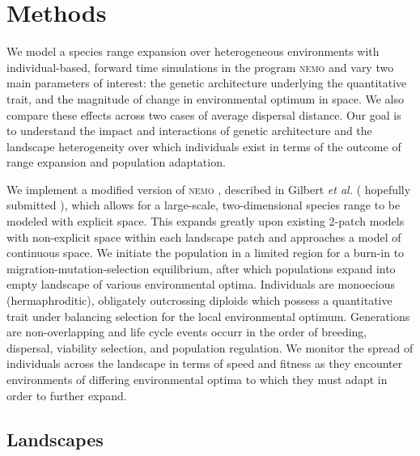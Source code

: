 


\section{Methods}


We model a species range expansion over heterogeneous environments with individual-based, forward time simulations in the program \textsc{nemo} \citep{Guillaume:2006} and vary two main parameters of interest: the genetic architecture underlying the quantitative trait, and the magnitude of change in environmental optimum in space. We also compare these effects across two cases of average dispersal distance. Our goal is to understand the impact and interactions of genetic architecture and the landscape heterogeneity over which individuals exist in terms of the outcome of range expansion and population adaptation.

We implement a modified version of \textsc{nemo} \citep{Guillaume:2006}, described in Gilbert \emph{et al.} (\color{red} \footnotesize hopefully submitted \normalsize \color{black}), which allows for a large-scale, two-dimensional species range to be modeled with explicit space. This expands greatly upon existing 2-patch models with non-explicit space within each landscape patch and approaches a model of continuous space. We initiate the population in a limited region for a burn-in to migration-mutation-selection equilibrium, after which populations expand into empty landscape of various environmental optima. Individuals are monoecious (hermaphroditic), obligately outcrossing diploids which possess a quantitative trait under balancing selection for the local environmental optimum. Generations are non-overlapping and life cycle events occurr in the order of breeding, dispersal, viability selection, and population regulation. We monitor the spread of individuals across the landscape in terms of speed and fitness as they encounter environments of differing environmental optima to which they must adapt in order to further expand.



\subsection{Landscapes}

